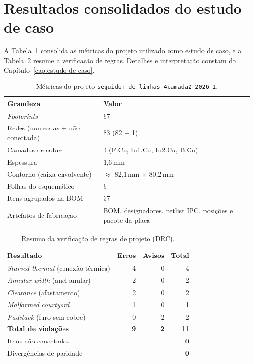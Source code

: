 \section{Resultados consolidados do estudo de caso}

A Tabela~\ref{tab:placa-mono} consolida as métricas do projeto utilizado como
estudo de caso, e a Tabela~\ref{tab:drc-resumo} resume a verificação de
regras. Detalhes e interpretação constam do Capítulo~\ref{cap:estudo-de-caso}.

\begin{table}[htbp]
\centering
\small
\caption{Métricas do projeto \texttt{seguidor\_de\_linhas\_4camada2-2026-1}.}
\label{tab:placa-mono}
\begin{tabular}{@{}p{7.4cm}p{7.2cm}@{}}
\toprule
\textbf{Grandeza} & \textbf{Valor} \\
\midrule
\emph{Footprints} & 97 \\
Redes (nomeadas + não conectada) & 83 (82 + 1) \\
Camadas de cobre & 4 (F.Cu, In1.Cu, In2.Cu, B.Cu) \\
Espessura & 1,6\,mm \\
Contorno (caixa envolvente) & $\approx$ 82,1\,mm $\times$ 80,2\,mm \\
Folhas do esquemático & 9 \\
Itens agrupados na BOM & 37 \\
Artefatos de fabricação & BOM, designadores, netlist IPC, posições e pacote da placa \\
\bottomrule
\end{tabular}
\end{table}

\begin{table}[htbp]
\centering
\small
\caption{Resumo da verificação de regras de projeto (DRC).}
\label{tab:drc-resumo}
\begin{tabular}{@{}p{4.6cm}rrr@{}}
\toprule
\textbf{Resultado} & \textbf{Erros} & \textbf{Avisos} & \textbf{Total} \\
\midrule
\emph{Starved thermal} (conexão térmica) & 4 & 0 & 4 \\
\emph{Annular width} (anel anular) & 2 & 0 & 2 \\
\emph{Clearance} (afastamento) & 2 & 0 & 2 \\
\emph{Malformed courtyard} & 1 & 0 & 1 \\
\emph{Padstack} (furo sem cobre) & 0 & 2 & 2 \\
\midrule
\textbf{Total de violações} & \textbf{9} & \textbf{2} & \textbf{11} \\
Itens não conectados & -- & -- & \textbf{0} \\
Divergências de paridade & -- & -- & \textbf{0} \\
\bottomrule
\end{tabular}
\end{table}

